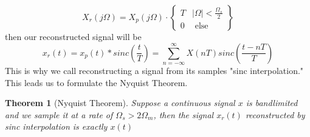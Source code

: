 \documentclass{article}
\newtheorem{theorem}{Theorem}
\begin{document}
\[
    X_r(j\Omega) = X_p(j\Omega)\cdot \left\{
            \begin{array}{cc}
                T & |\Omega| < \frac{\Omega_s}{2}\\
                0 & \text{ else }
            \end{array}
        \right\}
\]
then our reconstructed signal will be
$$x_r(t) = x_p(t)*sinc\left(\frac{t}{T}\right) = \sum_{n=-\infty}^{\infty}{X(nT)sinc\left(\frac{t-nT}{T}\right)}$$
This is why we call reconstructing a signal from its samples "sinc interpolation."
This leads us to formulate the Nyquist Theorem.
\begin{theorem}[Nyquist Theorem]
    Suppose a continuous signal $x$ is bandlimited and we sample it at a rate of $\Omega_s > 2\Omega_m$, then the signal $x_r(t)$
    reconstructed by sinc interpolation is exactly $x(t)$
\end{theorem}
\end{document}
